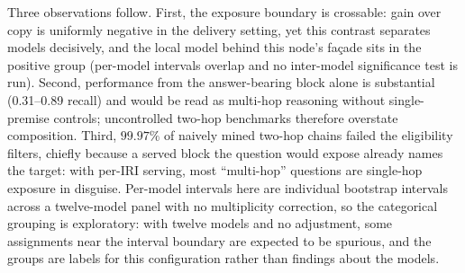 \documentclass[10pt,twocolumn]{article}
\begin{document}
Three observations follow. First, the exposure boundary is crossable: gain over copy is uniformly
negative in the delivery setting, yet this contrast separates models decisively, and the local model
behind this node's fa\c{c}ade sits in the positive group (per-model intervals overlap and no
inter-model significance test is run). Second, performance from
the answer-bearing block alone is substantial (0.31--0.89 recall) and would be read as multi-hop
reasoning without single-premise controls; uncontrolled two-hop benchmarks therefore overstate
composition. Third, $99.97\%$ of naively mined two-hop chains failed the eligibility
filters, chiefly because a served block the question would expose already names the target: with
per-IRI serving, most ``multi-hop'' questions are single-hop exposure in disguise. Per-model intervals here are individual
bootstrap intervals across a twelve-model panel with no multiplicity correction, so the categorical
grouping is exploratory: with twelve models and no adjustment, some assignments near the interval
boundary are expected to be spurious, and the groups are labels for this configuration rather than
findings about the models.
\end{document}
